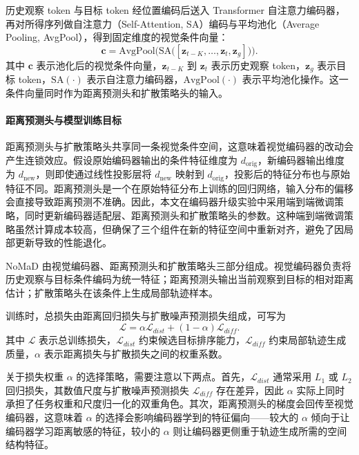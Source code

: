 历史观察 token 与目标 token 经位置编码后送入 Transformer 自注意力编码器，再对所得序列做自注意力（Self-Attention, SA）编码与平均池化（Average Pooling, AvgPool），得到固定维度的视觉条件向量：
\begin{equation}
\mathbf{c} = \text{AvgPool}\bigl(\text{SA}\bigl([\mathbf{z}_{t-K},\ldots,\mathbf{z}_t,\mathbf{z}_g]\bigr)\bigr).
\end{equation}
其中 $\mathbf{c}$ 表示池化后的视觉条件向量，$\mathbf{z}_{t-K}$ 到 $\mathbf{z}_t$ 表示历史观察 token，$\mathbf{z}_g$ 表示目标 token，$\text{SA}(\cdot)$ 表示自注意力编码器，$\text{AvgPool}(\cdot)$ 表示平均池化操作。这一条件向量同时作为距离预测头和扩散策略头的输入。

\paragraph*{距离预测头与模型训练目标}

距离预测头与扩散策略头共享同一条视觉条件空间，这意味着视觉编码器的改动会产生连锁效应。假设原始编码器输出的条件特征维度为 $d_{\text{orig}}$，新编码器输出维度为 $d_{\text{new}}$，则即使通过线性投影层将 $d_{\text{new}}$ 映射到 $d_{\text{orig}}$，投影后的特征分布也与原始特征不同。距离预测头是一个在原始特征分布上训练的回归网络，输入分布的偏移会直接导致距离预测不准确。因此，本文在编码器升级实验中采用端到端微调策略，同时更新编码器适配层、距离预测头和扩散策略头的参数。这种端到端微调策略虽然计算成本较高，但确保了三个组件在新的特征空间中重新对齐，避免了因局部更新导致的性能退化。

NoMaD 由视觉编码器、距离预测头和扩散策略头三部分组成\cite{nomad2023}。视觉编码器负责将历史观察与目标条件编码为统一特征；距离预测头输出当前观察到目标的相对距离估计；扩散策略头在该条件上生成局部轨迹样本。

训练时，总损失由距离回归损失与扩散噪声预测损失组成，可写为
\begin{equation}
\mathcal{L} = \alpha \mathcal{L}_{dist} + (1-\alpha)\mathcal{L}_{diff}.
\end{equation}
其中 $\mathcal{L}$ 表示总训练损失，$\mathcal{L}_{dist}$ 约束候选目标排序能力，$\mathcal{L}_{diff}$ 约束局部轨迹生成质量，$\alpha$ 表示距离损失与扩散损失之间的权重系数。

关于损失权重 $\alpha$ 的选择策略，需要注意以下两点。首先，$\mathcal{L}_{dist}$ 通常采用 $L_1$ 或 $L_2$ 回归损失，其数值尺度与扩散噪声预测损失 $\mathcal{L}_{diff}$ 存在差异，因此 $\alpha$ 实际上同时承担了任务权重和尺度归一化的双重角色。其次，距离预测头的梯度会回传至视觉编码器，这意味着 $\alpha$ 的选择会影响编码器学到的特征偏向——较大的 $\alpha$ 倾向于让编码器学习距离敏感的特征，较小的 $\alpha$ 则让编码器更侧重于轨迹生成所需的空间结构特征。

